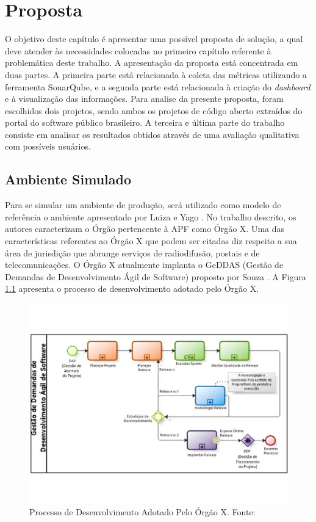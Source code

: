 \chapter[Proposta]{Proposta}
O objetivo deste capítulo é apresentar uma possível proposta de solução, a qual deve atender às necessidades colocadas no primeiro capítulo referente à problemática deste trabalho. A apresentação da proposta está concentrada em duas partes. A primeira parte está relacionada à coleta das métricas utilizando a ferramenta SonarQube, e a segunda parte está relacionada à criação do \textit{dashboard} e à visualização das informações. Para analise da presente proposta, foram escolhidos dois projetos, sendo ambos os projetos de código aberto extraídos do portal do software público brasileiro. A terceira e última parte do trabalho consiste em analisar os resultados obtidos através de uma avaliação qualitativa com possíveis usuários.

\section{Ambiente Simulado}
Para se simular um ambiente de produção, será utilizado como modelo de referência o ambiente apresentado por Luiza e Yago \cite{luiza_yago}. No trabalho descrito, os autores caracterizam o Órgão pertencente à APF como Órgão X. Uma das características referentes ao Órgão X que podem ser citadas diz respeito a sua área de jurisdição que abrange serviços de radiodifusão, postais e de telecomunicações. O Órgão X atualmente implanta o GeDDAS (Gestão de Demandas de Desenvolvimento Ágil de Software) proposto por Souza \cite{souza_sobrinho_uso_2014}. A Figura \ref{img:proc_des} apresenta o processo de desenvolvimento adotado pelo Órgão X.

\graphicspath{{figuras/}}
\begin{figure}[h!]
\centering
\includegraphics[scale=0.60]{Proc_des.pdf}
\caption{Processo de Desenvolvimento Adotado Pelo Órgão X. Fonte: \cite{luiza_yago}}
\label{img:proc_des}
\end{figure}

